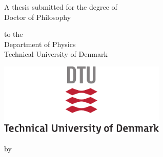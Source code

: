 \begin{titlepage}
    \pagestyle{empty}
    \begin{center}
        \vspace*{1cm}

        \Huge{\textbf{\thesisTitle}}

        \vspace{1.5cm}

        \large
        A thesis submitted for the degree of\\
        Doctor of Philosophy

        \vspace{0.8cm}
        to the\\
        Department of Physics\\
        Technical University of Denmark

        \vfill

        \includegraphics[width=0.6\textwidth]{fig/DTULogo}

        \vfill
        by\\
        \authorName\\

    \end{center}
    \clearpage
    \newpage
    \clearpage
    \thispagestyle{empty}
    \begin{center}
        \vspace*{1cm}

        \Huge{\textbf{\thesisTitle}}

        \vspace{1.5cm}
        \vfill


\end{center}
\end{titlepage}
